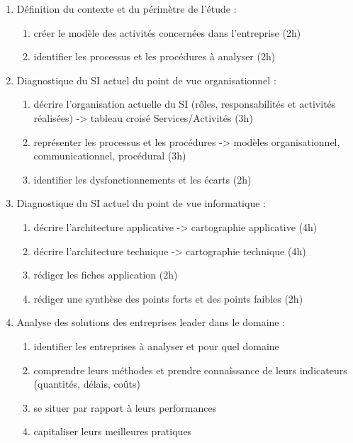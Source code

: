\begin{enumerate}
\begin{enumerate}
            \item Définition du contexte et du périmètre de l'étude :
                \begin{enumerate}
                  \item créer le modèle des activités concernées dans l'entreprise (2h)
                  \item  identifier les processus et les procédures à analyser (2h)
                \end{enumerate}
            \item Diagnostique du SI actuel du point de vue organisationnel : 
                \begin{enumerate}
                  \item décrire l'organisation actuelle du SI (rôles, responsabilités et activités réalisées) -> tableau croisé Services/Activités (3h)
                  \item représenter les processus et les procédures -> modèles organisationnel, communicationnel, procédural (3h)
                  \item identifier les dysfonctionnements et les écarts (2h)
                \end{enumerate}
            \item Diagnostique du SI actuel du point de vue informatique : 
                \begin{enumerate}
                  \item décrire l'architecture applicative -> cartographie applicative (4h)
                  \item décrire l'architecture technique -> cartographie technique (4h)
                  \item rédiger les fiches application (2h)
                  \item rédiger une synthèse des points forts et des points faibles (2h)
                \end{enumerate}
            \item Analyse des solutions des entreprises leader dans le domaine : 
                \begin{enumerate}
                  \item identifier les entreprises à analyser et pour quel domaine 
                  \item comprendre leurs méthodes et prendre connaîssance de leurs indicateurs (quantités, délais, coûts) 
                  \item se situer par rapport à leurs performances
                  \item capitaliser leurs meilleures pratiques

\end{enumerate}
\end{enumerate}
\end{enumerate}
